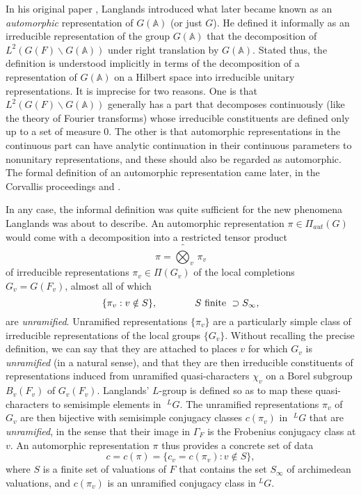 \documentclass[preprint,12pt, leqno]{elsarticle}
\newcommand{\mA}{\mathbb{A}}
\newcommand{\ubf}[1]{\textit{#1}}
\newcommand{\LG}{\;^LG}
\newcommand{\SP}{\mkern70mu }
\numberwithin{equation}{section}
\theoremstyle{named}
\begin{document}
In his original paper \cite{L2}, Langlands introduced what later became known as an \ubf{automorphic} representation of $G(\mA)$ (or just $G$). He defined it informally as an irreducible representation of the group $G(\mA)$ that  the decomposition of $L^2(G(F)\backslash G(\mA))$ under right translation by $G(\mA)$. Stated thus, the definition is understood implicitly in terms of the decomposition of a representation of $G(\mA)$ on a Hilbert space into irreducible unitary representations. It is imprecise for two reasons. One is that $L^2(G(F)\backslash G(\mA))$ generally has a part that decomposes continuously (like the theory of Fourier transforms) whose irreducible constituents are defined only up to a set of measure $0$. The other is that automorphic representations in the continuous part can have analytic continuation in their continuous parameters to nonunitary representations, and these should also be regarded as automorphic. The formal definition of an automorphic representation came later, in the Corvallis proceedings \cite{BJ} and \cite{L5}.

In any case, the informal definition was quite sufficient for the new phenomena Langlands was about to describe. An automorphic representation $\pi\in\Pi_{aut}(G)$ would come with a decomposition into a restricted tensor product
\begin{equation*}
    \pi = \displaystyle\widetilde{\bigotimes_v}\, \pi_v
\end{equation*}
of irreducible representations $\pi_v\in \Pi(G_v)$ of the local completions $G_v = G(F_v)$, almost all of which
\begin{equation}\label{eq: 2.3}
    \{\pi_v : v\notin S\}, \SP S \mbox{ finite }\supset S_{\infty},
\end{equation}
are \ubf{unramified}. Unramified representations $\{\pi_v\}$ are a particularly simple class of irreducible representations of the local groups $\{G_v\}$. Without recalling the precise definition, we can say that they are attached to places $v$ for which $G_v$ is \ubf{unramified} (in a natural sense), and that they are then irreducible constituents of representations induced from unramified quasi-characters $\chi_v$ on a Borel subgroup $B_v(F_v)$ of $G_v(F_v)$. Langlands' $L$-group is defined so as to map these quasi-characters to semisimple elements in $\LG$. The unramified representations $\pi_v$ of $G_v$ are then bijective with semisimple conjugacy classes $c(\pi_v)$ in $\LG$ that are \ubf{unramified}, in the sense that their image in $\Gamma_F$ is the Frobenius conjugacy class at $v$. An automorphic representation $\pi$ thus provides a concrete set of data
\begin{equation}\label{eq:2.4}
    c = c(\pi) = \{c_v = c(\pi_v): v\notin S\},
\end{equation}
where $S$ is a finite set of valuations of $F$ that contains the set $S_{\infty}$ of archimedean valuations, and $c(\pi_v)$ is an unramified conjugacy class in$\LG$.
\end{document}
